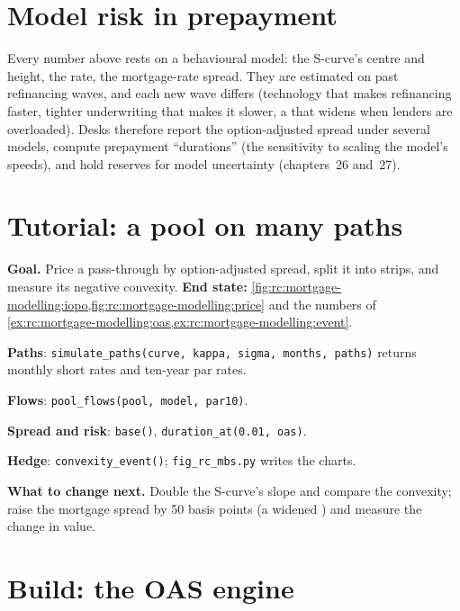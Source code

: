 \section{Model risk in prepayment}

Every number above rests on a behavioural model: the S-curve's centre and height, the
 rate, the mortgage-rate spread. They are estimated on past refinancing waves,
and each new wave differs (technology that makes refinancing faster, tighter
underwriting that makes it slower, a  that widens when lenders
are overloaded). Desks therefore report the option-adjusted spread under several
models, compute prepayment ``durations'' (the sensitivity to scaling the model's speeds),
and hold reserves for model uncertainty (chapters~26 and~27).

\section{Tutorial: a pool on many paths}\label{tut:rc:mortgage-modelling:tutorial}

\begin{tutorial}
\textbf{Goal.} Price a pass-through by option-adjusted spread, split it into strips,
and measure its negative convexity. \textbf{End state:}
\cref{fig:rc:mortgage-modelling:iopo,fig:rc:mortgage-modelling:price} and the numbers of
\cref{ex:rc:mortgage-modelling:oas,ex:rc:mortgage-modelling:event}.
\begin{tutsteps}
\item \textbf{Paths}: \texttt{simulate\_paths(curve, kappa, sigma, months, paths)} returns
monthly short rates and ten-year par rates.
\item \textbf{Flows}: \texttt{pool\_flows(pool, model, par10)}.
\item \textbf{Spread and risk}: \texttt{base()}, \texttt{duration\_at(0.01, oas)}.
\item \textbf{Hedge}: \texttt{convexity\_event()}; \texttt{fig\_rc\_mbs.py} writes the
charts.
\end{tutsteps}
\textbf{What to change next.} Double the S-curve's slope and compare the convexity;
raise the mortgage spread by 50 basis points (a widened ) and
measure the change in value.
\end{tutorial}

\section{Build: the OAS engine}\label{bld:rc:mortgage-modelling:mbsoas}


